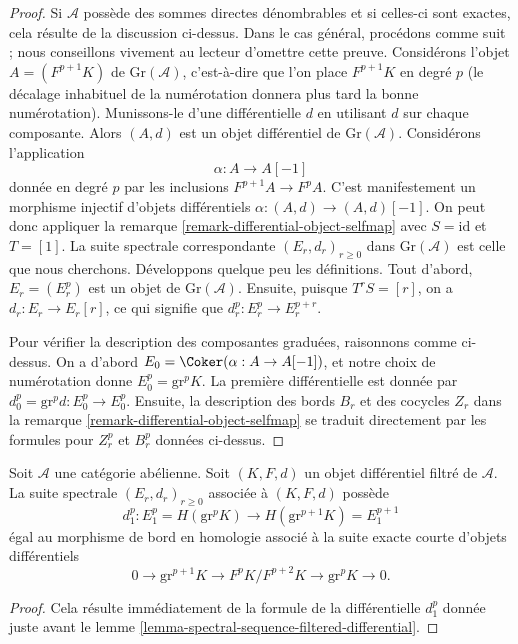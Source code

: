 \begin{proof}
Si $\mathcal{A}$ possède des sommes directes dénombrables et si celles-ci
sont exactes, cela résulte de la discussion ci-dessus.
Dans le cas général, procédons comme suit ; nous conseillons vivement au lecteur
d'omettre cette preuve. Considérons l'objet $A = (F^{p + 1}K)$ de
$\text{Gr}(\mathcal{A})$, c'est-à-dire que l'on place $F^{p + 1}K$ en degré $p$
(le décalage inhabituel de la numérotation donnera plus tard la bonne numérotation).
Munissons-le d'une différentielle $d$ en utilisant $d$ sur chaque composante.
Alors $(A, d)$ est un objet différentiel de $\text{Gr}(\mathcal{A})$.
Considérons l'application
$$
\alpha : A \to A[-1]
$$
donnée en degré $p$ par les inclusions $F^{p + 1}A \to F^pA$.
C'est manifestement un morphisme injectif d'objets différentiels
$\alpha : (A, d) \to (A, d)[-1]$. On peut donc appliquer la
remarque \ref{remark-differential-object-selfmap}
avec $S = \text{id}$ et $T = [1]$.
La suite spectrale correspondante $(E_r, d_r)_{r \geq 0}$
dans $\text{Gr}(\mathcal{A})$ est celle que nous cherchons.
Développons quelque peu les définitions.
Tout d'abord, $E_r = (E_r^p)$ est un objet de $\text{Gr}(\mathcal{A})$.
Ensuite, puisque $T^rS = [r]$, on a $d_r : E_r \to E_r[r]$, ce qui signifie que
$d_r^p : E_r^p \to E_r^{p + r}$.

\medskip\noindent
Pour vérifier la description des composantes graduées, raisonnons
comme ci-dessus. On a d'abord $E_0 = \Coker(\alpha : A \to A[-1])$,
et notre choix de numérotation donne
$E_0^p = \text{gr}^pK$. La première différentielle est donnée par
$d_0^p = \text{gr}^pd : E_0^p \to E_0^p$.
Ensuite, la description des bords $B_r$ et des cocycles $Z_r$
dans la remarque \ref{remark-differential-object-selfmap}
se traduit directement par les formules
pour $Z_r^p$ et $B_r^p$ données ci-dessus.
\end{proof}

\begin{lemma}
\label{lemma-spectral-sequence-filtered-differential-d1}
Soit $\mathcal{A}$ une catégorie abélienne. Soit $(K, F, d)$ un objet
différentiel filtré de $\mathcal{A}$. La suite spectrale
$(E_r, d_r)_{r \geq 0}$ associée à $(K, F, d)$ possède
$$
d_1^p :
E_1^p = H(\text{gr}^pK)
\longrightarrow
H(\text{gr}^{p + 1}K) = E_1^{p + 1}
$$
égal au morphisme de bord en homologie associé à la suite
exacte courte d'objets différentiels
$$
0 \to \text{gr}^{p + 1}K \to F^pK/F^{p + 2}K \to \text{gr}^pK \to 0.
$$
\end{lemma}

\begin{proof}
Cela résulte immédiatement de la formule de la différentielle $d_1^p$
donnée juste avant le lemme \ref{lemma-spectral-sequence-filtered-differential}.
\end{proof}

